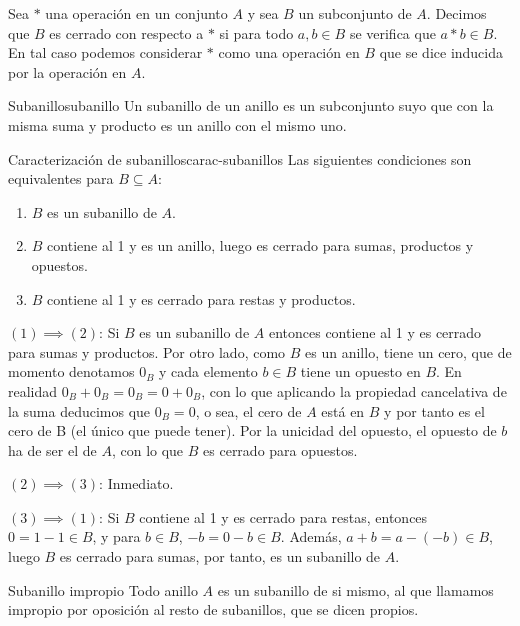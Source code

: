 Sea $*$ una operación en un conjunto $A$ y sea $B$ un subconjunto de $A$. Decimos que $B$ es cerrado con respecto a $*$ si para todo $a, b \in B$ se verifica que $a * b \in B$. En tal caso podemos
considerar $*$ como una operación en $B$ que se dice inducida por la operación en $A$.

\begin{definition}{Subanillo}{subanillo}
    Un subanillo de un anillo es un subconjunto suyo que con la misma suma y producto es un anillo con el mismo uno.
\end{definition}

\begin{proposition}{Caracterización de subanillos}{carac-subanillos}
    Las siguientes condiciones son equivalentes para \( B \subseteq A \):
    \begin{enumerate}
    \item \( B \) es un subanillo de \( A \).
    \item \( B \) contiene al 1 y es un anillo, luego es cerrado para sumas, productos y opuestos.
    \item \( B \) contiene al 1 y es cerrado para restas y productos.
    \end{enumerate}
\end{proposition}

\begin{proofbox}
    $(1) \implies (2)$: Si \( B \) es un subanillo de \(A\) entonces contiene al 1 y es cerrado para sumas y productos. Por otro lado, como $B$ es un anillo, tiene un cero, que de momento denotamos $0_B$ y cada elemento $b \in B$ tiene un opuesto en $B$. En realidad $0_B + 0_B = 0_B = 0 + 0_B$, con lo que aplicando la propiedad cancelativa de la suma deducimos que $0_B = 0$, o sea, el cero de $A$ está en $B$ y por tanto es el cero de B (el único que puede tener). Por la unicidad del opuesto, el opuesto de $b$ ha de ser el de $A$, con lo que $B$ es cerrado para opuestos.

    \noindent$(2) \implies (3)$: Inmediato.

    \noindent$(3) \implies (1)$: Si \( B \) contiene al 1 y es cerrado para restas, entonces \( 0 = 1 - 1 \in B \), y para \( b \in B \), \(-b = 0 - b \in B \). Además, \( a + b = a - (-b) \in B \), luego \( B \) es cerrado para sumas, por tanto, es un subanillo de $A$.
\end{proofbox}

\begin{example}{Subanillo impropio}{}
    Todo anillo $A$ es un subanillo de si mismo, al que llamamos impropio por oposición al resto de subanillos, que se dicen propios.
\end{example}

